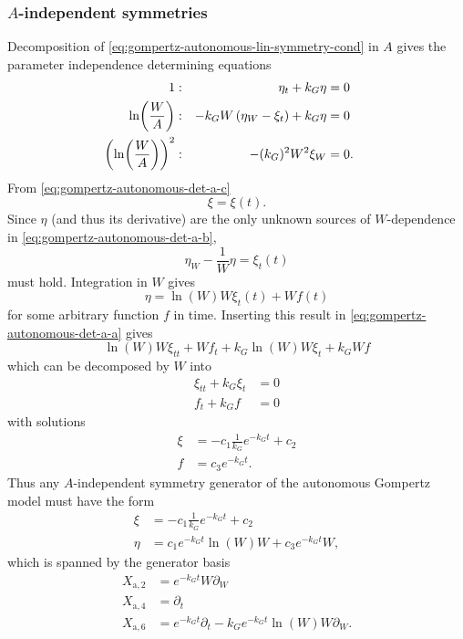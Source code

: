 \subsubsection{\texorpdfstring{\(A\)-independent symmetries}{Carrying capacity-independent symmetries}}

Decomposition of \cref{eq:gompertz-autonomous-lin-symmetry-cond} in \(A\) gives the parameter independence determining equations
\begin{subequations}
  \begin{flalign}
    1 & : & \eta_t + k_G \eta &= 0 && \FlLabel{eq:gompertz-autonomous-det-a-a}\\
    \ln(\frac{W}{A}) & : & - k_G W\left(\eta_W - \xi_t\right)  + k_G \eta &= 0 && \FlLabel{eq:gompertz-autonomous-det-a-b}\\
    \left(\ln(\frac{W}{A})\right)^2 & : & - (k_G)^2 W^2 \xi_W &= 0. && \FlLabel{eq:gompertz-autonomous-det-a-c}
  \end{flalign}
\end{subequations}
From \cref{eq:gompertz-autonomous-det-a-c}
\begin{equation}
  \xi = \xi(t).
\end{equation}
Since \(\eta\) (and thus its derivative) are the only unknown sources of \(W\)-dependence in \cref{eq:gompertz-autonomous-det-a-b},
\begin{equation}
  \eta_W - \frac{1}{W}\eta = \xi_t(t)
\end{equation}
must hold.
Integration in \(W\) gives
\begin{equation}
  \eta = \ln(W) W \xi_t(t) + W f(t)
\end{equation}
for some arbitrary function \(f\) in time.
Inserting this result in \cref{eq:gompertz-autonomous-det-a-a} gives
\begin{equation}
  \ln(W) W \xi_{tt} + W f_t + k_G \ln(W) W \xi_t + k_G W f
\end{equation}
which can be decomposed by \(W\) into
\begin{align}
  \xi_{tt} + k_G \xi_t &= 0 \\
  f_t + k_G f &= 0
\end{align}
with solutions
\begin{align}
  \xi &= - c_1 \frac{1}{k_G} e^{-k_G t} + c_2 \\
  f &= c_3 e^{-k_G t}.
\end{align}
Thus any \(A\)-independent symmetry generator of the autonomous Gompertz model  must have the form
\begin{align}
  \xi &= - c_1 \frac{1}{k_G} e^{-k_G t} + c_2 \\
  \eta &= c_1 e^{-k_G t} \ln(W) W  + c_3 e^{-k_G t} W,
\end{align}
which is spanned by the generator basis
\begin{align}
  X_{\text{a},2} &= e^{-k_G t} W \partial_W \\
  X_{\text{a},4} &= \partial_t \\
  X_{\text{a},6} &= e^{-k_G t} \partial_t - k_G e^{-k_G t} \ln(W) W \partial_W.
\end{align}

